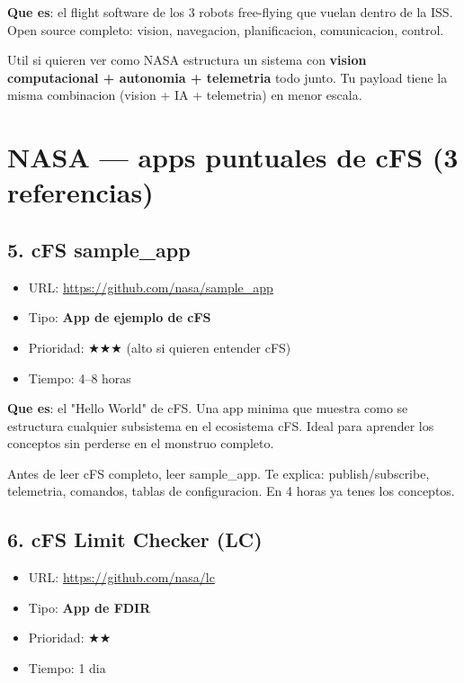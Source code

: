 \documentclass[11pt,a4paper,oneside]{report}
\begin{document}
\textbf{Que es}: el flight software de los 3 robots free-flying que vuelan
dentro de la ISS. Open source completo: vision, navegacion, planificacion,
comunicacion, control.

\begin{nota}
Util si quieren ver como NASA estructura un sistema con \textbf{vision
computacional + autonomia + telemetria} todo junto. Tu payload tiene la
misma combinacion (vision + IA + telemetria) en menor escala.
\end{nota}

\chapter{NASA --- apps puntuales de cFS (3 referencias)}

\section{5. cFS sample\_app}

\begin{itemize}[leftmargin=1.5em]
  \item URL: \url{https://github.com/nasa/sample_app}
  \item Tipo: \textbf{App de ejemplo de cFS}
  \item Prioridad: $\bigstar\bigstar\bigstar$ (alto si quieren entender cFS)
  \item Tiempo: 4--8 horas
\end{itemize}

\textbf{Que es}: el "Hello World" de cFS. Una app minima que muestra como
se estructura cualquier subsistema en el ecosistema cFS. Ideal para
aprender los conceptos sin perderse en el monstruo completo.

\begin{nota}
Antes de leer cFS completo, leer sample\_app. Te explica:
publish/subscribe, telemetria, comandos, tablas de configuracion. En 4 horas
ya tenes los conceptos.
\end{nota}

\section{6. cFS Limit Checker (LC)}

\begin{itemize}[leftmargin=1.5em]
  \item URL: \url{https://github.com/nasa/lc}
  \item Tipo: \textbf{App de FDIR}
  \item Prioridad: $\bigstar\bigstar$
  \item Tiempo: 1 dia
\end{itemize}
\end{document}
